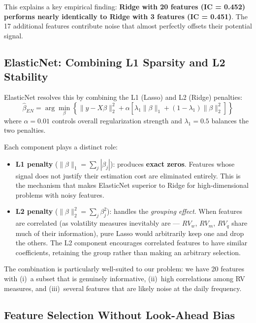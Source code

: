 \documentclass[11pt,a4paper]{article}
\begin{document}
This explains a key empirical finding: \textbf{Ridge with 20 features (IC = 0.452) performs nearly identically to Ridge with 3 features (IC = 0.451)}. The 17 additional features contribute noise that almost perfectly offsets their potential signal.

\subsection{ElasticNet: Combining L1 Sparsity and L2 Stability}

ElasticNet \citep{zou2005} resolves this by combining the L1 (Lasso) and L2 (Ridge) penalties:
\begin{equation}
    \hat{\beta}_{EN} = \arg\min_\beta \left\{ \|y - X\beta\|_2^2 + \alpha \left[ \lambda_1 \|\beta\|_1 + (1-\lambda_1) \|\beta\|_2^2 \right] \right\}
    \label{eq:elasticnet}
\end{equation}
where $\alpha = 0.01$ controls overall regularization strength and $\lambda_1 = 0.5$ balances the two penalties.

Each component plays a distinct role:
\begin{itemize}
    \item \textbf{L1 penalty} ($\|\beta\|_1 = \sum_j |\beta_j|$): produces \textbf{exact zeros}. Features whose signal does not justify their estimation cost are eliminated entirely. This is the mechanism that makes ElasticNet superior to Ridge for high-dimensional problems with noisy features.
    \item \textbf{L2 penalty} ($\|\beta\|_2^2 = \sum_j \beta_j^2$): handles the \textit{grouping effect}. When features are correlated (as volatility measures inevitably are --- $RV_w$, $RV_m$, $RV_q$ share much of their information), pure Lasso would arbitrarily keep one and drop the others. The L2 component encourages correlated features to have similar coefficients, retaining the group rather than making an arbitrary selection.
\end{itemize}

The combination is particularly well-suited to our problem: we have 20 features with (i)~a subset that is genuinely informative, (ii)~high correlations among RV measures, and (iii)~several features that are likely noise at the daily frequency.

\subsection{Feature Selection Without Look-Ahead Bias}
\label{sec:selection}
\end{document}

